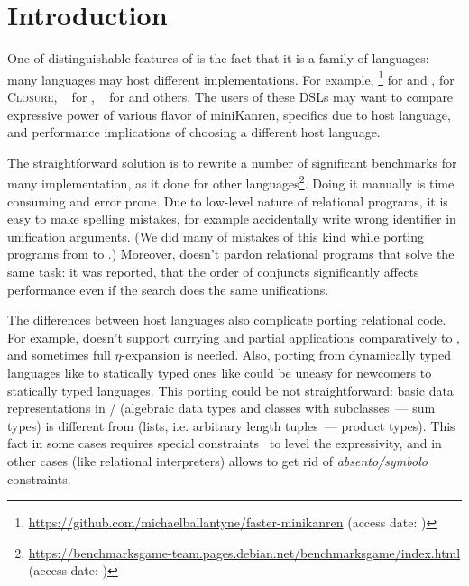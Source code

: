 

\section{Introduction}
\label{sec:intro}


One of distinguishable features of \miniKanren{} is the fact that it is a family of languages:
many languages may host different \miniKanren{} implementations.
For example, \faster{}\footnote{\url{https://github.com/michaelballantyne/faster-minikanren} (access date: )} for \Scheme{} and \Racket{}, \CoreLogic{} for \textsc{Closure}, \OCanren{}~\cite{OCanren} for \OCaml{}, \Klogic{}~\cite{Klogic2023} for \Kotlin{} and others.
The users of these DSLs may want to compare expressive power of various flavor of miniKanren, specifics due to host language, and performance implications of choosing a different host language.


The straightforward solution is to rewrite a number of significant benchmarks for many implementation, as it done for other languages\footnote{\url{https://benchmarksgame-team.pages.debian.net/benchmarksgame/index.html} (access date: )}.
Doing it manually is time consuming and error prone.
Due to low-level nature of relational programs, it is easy to make spelling mistakes, for example accidentally write wrong identifier in unification arguments.
(We did many of mistakes of this kind while porting programs from \OCanren{} to \Klogic{}.) Moreover, \miniKanren{} doesn't pardon relational programs that solve the same task: it was reported, that the order of conjuncts significantly affects~\cite{scheduling2022} performance even if the search does the same unifications.

The differences between host languages also complicate porting relational code.
For example, \Kotlin{} doesn't support currying and partial applications comparatively to \OCaml{}, and sometimes full $\eta$-expansion is needed.
Also, porting from dynamically typed languages like \Scheme{} to statically typed ones like \OCaml{} could be uneasy for newcomers to statically typed languages.
This porting could be not straightforward:
basic data representations in \OCaml{}/\Klogic{} (algebraic data types and classes with subclasses~--- sum types) is different from \Scheme{} (lists, i.e. arbitrary length tuples~--- product types).
This fact in some cases requires special constraints~\cite{Wildcards2023} to level the expressivity, and in other cases (like relational interpreters) allows to get rid of \emph{absento/symbolo} constraints.

